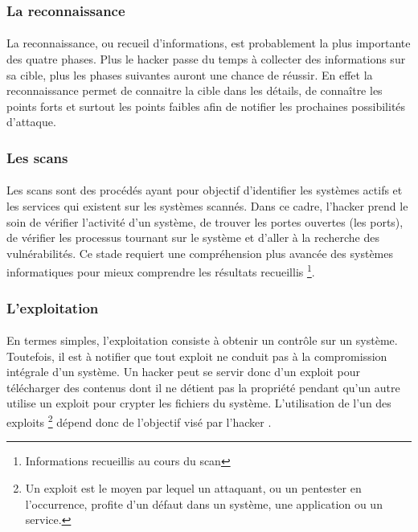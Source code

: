   \subsubsection{La reconnaissance}
    \paragraph{}
      La reconnaissance, ou recueil d’informations, est probablement la plus importante des quatre phases. Plus le hacker passe du temps à collecter des informations sur sa cible, plus les phases suivantes auront une chance de réussir\cite{c}. En effet la reconnaissance permet de connaitre la cible dans les détails, de connaître les points forts et surtout les points faibles afin de notifier les prochaines possibilités d'attaque.

  \subsubsection{Les scans}
    \paragraph{}
      Les scans sont des procédés ayant pour objectif d’identifier les systèmes actifs et les services qui existent sur les systèmes scannés. Dans ce cadre, l'hacker prend le soin de vérifier l'activité d'un système, de trouver les portes ouvertes (les ports), de vérifier les processus tournant sur le système et d'aller à la recherche des vulnérabilités. Ce stade requiert une compréhension plus avancée des systèmes informatiques pour mieux comprendre les résultats recueillis \footnote{Informations recueillis au cours du scan}\cite{c}.
      
  \subsubsection{L'exploitation}
    \paragraph{}
      En termes simples, l’exploitation consiste à obtenir un contrôle sur un système. Toutefois, il est à notifier que tout exploit ne conduit pas à la compromission intégrale d’un système. Un hacker peut se servir donc d'un exploit pour télécharger des contenus dont il ne détient pas la propriété pendant qu'un autre utilise un exploit pour crypter les fichiers du système. L'utilisation de l'un des exploits \footnote{Un exploit est le moyen par lequel un attaquant, ou un pentester en l’occurrence, profite d’un défaut dans un système, une application ou un service.} dépend donc de l'objectif visé par l'hacker \cite{E}.

